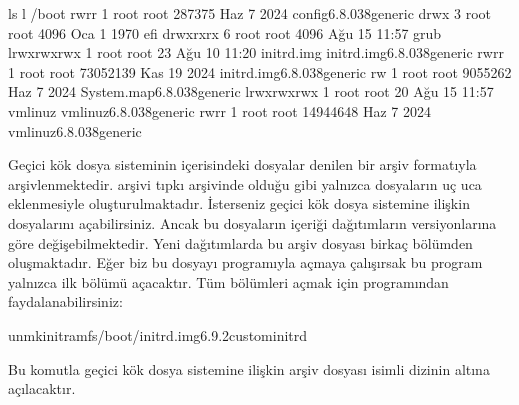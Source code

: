 \documentclass[a4paper,10pt,turkish]{sphinxmanual}
\begin{document}
\begin{sphinxVerbatim}[commandchars=\\\{\}]
\PYGZdl{} ls \PYGZhy{}l /boot
\PYGZhy{}rw\PYGZhy{}r\PYGZhy{}\PYGZhy{}r\PYGZhy{}\PYGZhy{} 1 root root    287375 Haz  7  2024 config\PYGZhy{}6.8.0\PYGZhy{}38\PYGZhy{}generic
drwx\PYGZhy{}\PYGZhy{}\PYGZhy{}\PYGZhy{}\PYGZhy{}\PYGZhy{} 3 root root      4096 Oca  1  1970 efi
drwxr\PYGZhy{}xr\PYGZhy{}x 6 root root      4096 Ağu 15 11:57 grub
lrwxrwxrwx 1 root root        23 Ağu 10 11:20 initrd.img \PYGZhy{}\PYGZgt{} initrd.img\PYGZhy{}6.8.0\PYGZhy{}38\PYGZhy{}generic
\PYGZhy{}rw\PYGZhy{}r\PYGZhy{}\PYGZhy{}r\PYGZhy{}\PYGZhy{} 1 root root  73052139 Kas 19  2024 initrd.img\PYGZhy{}6.8.0\PYGZhy{}38\PYGZhy{}generic
\PYGZhy{}rw\PYGZhy{}\PYGZhy{}\PYGZhy{}\PYGZhy{}\PYGZhy{}\PYGZhy{}\PYGZhy{} 1 root root   9055262 Haz  7  2024 System.map\PYGZhy{}6.8.0\PYGZhy{}38\PYGZhy{}generic
lrwxrwxrwx 1 root root        20 Ağu 15 11:57 vmlinuz \PYGZhy{}\PYGZgt{} vmlinuz\PYGZhy{}6.8.0\PYGZhy{}38\PYGZhy{}generic
\PYGZhy{}rw\PYGZhy{}r\PYGZhy{}\PYGZhy{}r\PYGZhy{}\PYGZhy{} 1 root root  14944648 Haz  7  2024 vmlinuz\PYGZhy{}6.8.0\PYGZhy{}38\PYGZhy{}generic
\end{sphinxVerbatim}

\sphinxAtStartPar
Geçici kök dosya sisteminin içerisindeki dosyalar  denilen bir arşiv formatıyla
arşivlenmektedir.  arşivi tıpkı  arşivinde olduğu gibi yalnızca dosyaların uç uca
eklenmesiyle oluşturulmaktadır. İsterseniz geçici kök dosya sistemine ilişkin 
dosyalarını açabilirsiniz. Ancak bu dosyaların içeriği dağıtımların versiyonlarına göre
değişebilmektedir. Yeni dağıtımlarda bu  arşiv dosyası birkaç bölümden oluşmaktadır.
Eğer biz bu dosyayı  programıyla açmaya çalışırsak bu program yalnızca ilk bölümü açacaktır.
Tüm bölümleri açmak için  programından faydalanabilirsiniz:

\begin{sphinxVerbatim}[commandchars=\\\{\}]
unmkinitramfs/boot/initrd.img\PYGZhy{}6.9.2\PYGZhy{}custominitrd
\end{sphinxVerbatim}

\sphinxAtStartPar
Bu komutla geçici kök dosya sistemine ilişkin arşiv dosyası  isimli dizinin altına
açılacaktır.
\end{document}
